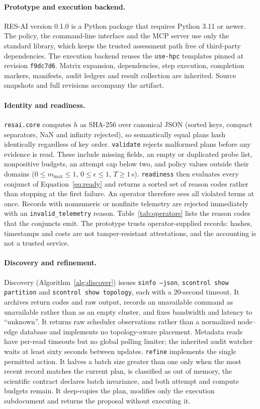 \documentclass[pdflatex,sn-mathphys-num]{sn-jnl}
\theoremstyle{thmstylethree}
\newcommand{\tool}{\textsc{RES-AI}}
\newcommand{\upstream}{\texttt{use-hpc}}
\newcommand{\code}[1]{\texttt{#1}}
\begin{document}
\paragraph{Prototype and execution backend.} \tool{} version 0.1.0 is a Python package that requires Python 3.11 or newer. The policy, the command-line interface and the MCP server use only the standard library, which keeps the trusted assessment path free of third-party dependencies. The execution backend reuses the \upstream{} templates pinned at revision \code{f9dc7d6}. Matrix expansion, dependencies, step execution, completion markers, manifests, audit ledgers and result collection are inherited. Source snapshots and full revisions accompany the artifact.

\paragraph{Identity and readiness.} \code{resai.core} computes $h$ as SHA-256 over canonical JSON (sorted keys, compact separators, NaN and infinity rejected), so semantically equal plans hash identically regardless of key order. \code{validate} rejects malformed plans before any evidence is read. These include missing fields, an empty or duplicated probe list, nonpositive budgets, an attempt cap below two, and policy values outside their domains ($0\leq m_{\max}\leq 1$, $0\leq\epsilon\leq 1$, $T\geq 1$\,s). \code{readiness} then evaluates every conjunct of Equation~\eqref{eq:ready} and returns a sorted set of reason codes rather than stopping at the first failure. An operator therefore sees all violated terms at once. Records with nonnumeric or nonfinite telemetry are rejected immediately with an \code{invalid\_telemetry} reason. Table~\ref{tab:operators} lists the reason codes that the conjuncts emit. The prototype trusts operator-supplied records: hashes, timestamps and costs are not tamper-resistant attestations, and the accounting is not a trusted service.

\paragraph{Discovery and refinement.} Discovery (Algorithm~\ref{alg:discover}) issues \code{sinfo --json}, \code{scontrol show partition} and \code{scontrol show topology}, each with a 20-second timeout. It archives return codes and raw output, records an unavailable command as unavailable rather than as an empty cluster, and fixes bandwidth and latency to ``unknown''. It returns raw scheduler observations rather than a normalized node--edge database and implements no topology-aware placement. Metadata reads have per-read timeouts but no global polling limiter; the inherited audit watcher waits at least sixty seconds between updates. \code{refine} implements the single permitted action. It halves a batch size greater than one only when the most recent record matches the current plan, is classified as out of memory, the scientific contract declares batch invariance, and both attempt and compute budgets remain. It deep-copies the plan, modifies only the execution subdocument and returns the proposal without executing it.
\end{document}
